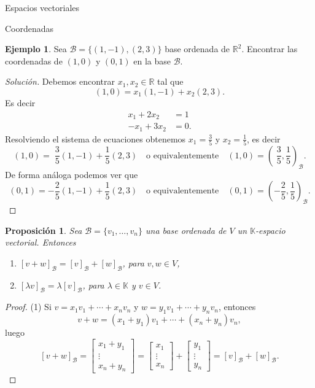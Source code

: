 \documentclass[a4paper,12pt,twoside,spanish]{amsbook}
\newtheorem{proposicion}[teorema]{Proposici\'on}
\theoremstyle{definition}
\newtheorem{ejemplo}{Ejemplo}[section]
\theoremstyle{remark}
\newcommand{\R}{\mathbb R}
\newcommand{\K}{\mathbb K}
\begin{document}
\begin{chapter}{Espacios vectoriales}
\begin{section}{Coordenadas}
	\begin{ejemplo}
		Sea $\mathcal B = \{(1,-1),(2,3)\}$ base ordenada de $\R^2$. Encontrar las coordenadas  de $(1,0)$ y $(0,1)$ en la base $\mathcal B$.
	\end{ejemplo}
	\begin{proof}[Solución] Debemos encontrar $x_1, x_2 \in \R$ tal que 
		$$
		(1,0) = x_1(1,-1)+ x_2(2,3).
		$$
		Es decir 
		\begin{align*}
			x_1+ 2x_2 &= 1\\
			-x_1 + 3x_2 &= 0.
		\end{align*}
		Resolviendo el sistema de ecuaciones obtenemos $x_1 = \frac35$ y $x_2 = \frac15$,  es decir
		$$
		(1,0) =\; \frac35(1,-1)+ \frac15(2,3)\quad \text{o equivalentemente} \quad (1,0) = (\;\frac35,\frac15)_{\mathcal B}.
		$$ 
		De forma análoga podemos ver que
		$$
		(0,1) = -\frac25(1,-1)+ \frac15(2,3)\quad \text{o equivalentemente} \quad (0,1) = (-\frac25,\frac15)_{\mathcal B}.
		$$
	\end{proof}
	
	\begin{proposicion}\label{vectorbase->lineal}
		Sea $\mathcal{B}=\{v_1,\ldots,v_n\}$ una base ordenada de $V$ un $\K$-espacio vectorial. Entonces
		\begin{enumerate}
			\item $[v + w]_\mathcal{B} = [v]_\mathcal{B} +[w]_\mathcal{B}$, para $v,w \in V$,
			\item $[\lambda v]_\mathcal{B} = \lambda[v]_\mathcal{B}$, para $\lambda \in \K$ y $v \in V$.
		\end{enumerate}
	\end{proposicion} 
	\begin{proof}
		(1) Si $v = x_1v_1 + \cdots +x_nv_n$ y $w = y_1v_1 + \cdots +y_nv_n$, entonces 
		$$
		v + w = (x_1+y_1)v_1 + \cdots +(x_n+y_n)v_n,
		$$
		luego
		$$
		[v + w]_\mathcal{B} = \begin{bmatrix}x_1+y_1 \\ \vdots \\ x_n+y_n\end{bmatrix}
		= \begin{bmatrix}x_1 \\ \vdots \\ x_n\end{bmatrix}+\begin{bmatrix}y_1 \\ \vdots \\ y_n\end{bmatrix} = [v]_\mathcal{B} +[w]_\mathcal{B}.
		$$
		

\end{proof}
\end{section}
\end{chapter}
\end{document}
